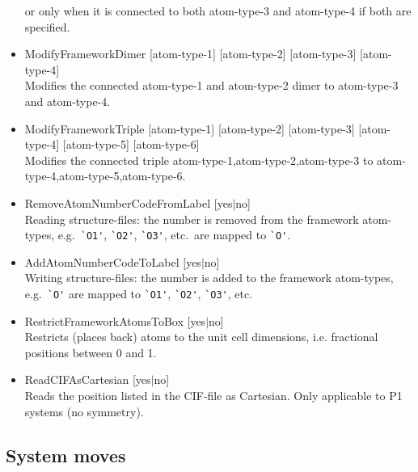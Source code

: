\begin{itemize}
or only when it is connected to both atom-type-3 and atom-type-4 if both are specified.
\item{ModifyFrameworkDimer [atom-type-1] [atom-type-2] [atom-type-3] [atom-type-4]}\\
Modifies the connected atom-type-1 and atom-type-2 dimer to atom-type-3 and atom-type-4.
\item{ModifyFrameworkTriple [atom-type-1] [atom-type-2] [atom-type-3] [atom-type-4] [atom-type-5] [atom-type-6]}\\
Modifies the connected triple atom-type-1,atom-type-2,atom-type-3 to atom-type-4,atom-type-5,atom-type-6.
\item{RemoveAtomNumberCodeFromLabel [yes$|$no]}\\
Reading structure-files: the number is removed from the framework atom-types, e.g.\ \verb=`O1'=, \verb=`O2'=, \verb=`O3'=, etc.\ are mapped to \verb=`O'=.
\item{AddAtomNumberCodeToLabel [yes$|$no]}\\
Writing structure-files: the number is added to the framework atom-types, e.g.\ \verb=`O'= are mapped to \verb=`O1'=, \verb=`O2'=, \verb=`O3'=, etc.
\item{RestrictFrameworkAtomsToBox [yes$|$no]}\\
Restricts (places back) atoms to the unit cell dimensions, i.e. fractional positions between 0 and 1.
\item{ReadCIFAsCartesian [yes$|$no]}\\
Reads the position listed in the CIF-file as Cartesian. Only applicable to P1 systems (no symmetry).
\end{itemize}

\subsection*{System moves}


